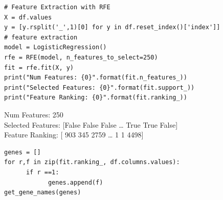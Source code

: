 \documentclass[11pt]{article}
\begin{document}
\begin{verbatim}
# Feature Extraction with RFE
X = df.values
y = [y.rsplit('_',1)[0] for y in df.reset_index()['index']]
# feature extraction
model = LogisticRegression()
rfe = RFE(model, n_features_to_select=250)
fit = rfe.fit(X, y)
print("Num Features: {0}".format(fit.n_features_))
print("Selected Features: {0}".format(fit.support_))
print("Feature Ranking: {0}".format(fit.ranking_))
\end{verbatim}

Num Features: 250\\
Selected Features: [False False False \ldots{}  True  True False]\\
Feature Ranking: [ 903  345 2759 \ldots{}    1    1 4498]\\


\begin{verbatim}
genes = []
for r,f in zip(fit.ranking_, df.columns.values):
      if r ==1:
            genes.append(f)
get_gene_names(genes)
\end{verbatim}
\end{document}
